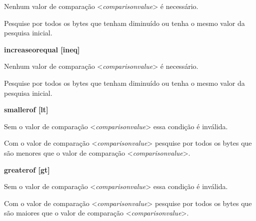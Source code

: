 \documentclass[letterpaper,10pt,brazil]{sphinxmanual}
\begin{document}
\begin{DUlineblock}{0em}
\begin{DUlineblock}{\DUlineblockindent}
\item[] 
\end{DUlineblock}
\item[] Nenhum valor de comparação \textless{}\emph{comparisonvalue}\textgreater{} é necessário.
\item[] 
\item[] Pesquise por todos os bytes que tenham diminuído ou tenha o mesmo valor da pesquisa inicial.
\item[] 
\item[]
\begin{DUlineblock}{\DUlineblockindent}
\item[] \textbf{increaseorequal {[}ineq{]}}
\item[] 
\end{DUlineblock}
\item[] Nenhum valor de comparação \textless{}\emph{comparisonvalue}\textgreater{} é necessário.
\item[] 
\item[] Pesquise por todos os bytes que tenham diminuído ou tenha o mesmo valor da pesquisa inicial.
\item[] 
\item[]
\begin{DUlineblock}{\DUlineblockindent}
\item[] \textbf{smallerof {[}lt{]}}
\item[] 
\end{DUlineblock}
\item[] Sem o valor de comparação \textless{}\emph{comparisonvalue}\textgreater{} essa condição é inválida.
\item[] Com o valor de comparação \textless{}\emph{comparisonvalue}\textgreater{} pesquise por todos os bytes que são menores que o valor de comparação \textless{}\emph{comparisonvalue}\textgreater{}.
\item[] 
\item[]
\begin{DUlineblock}{\DUlineblockindent}
\item[] \textbf{greaterof {[}gt{]}}
\item[] 
\end{DUlineblock}
\item[] Sem o valor de comparação \textless{}\emph{comparisonvalue}\textgreater{} essa condição é inválida.
\item[] Com o valor de comparação \textless{}\emph{comparisonvalue}\textgreater{} pesquise por todos os bytes que são maiores que o valor de comparação \textless{}\emph{comparisonvalue}\textgreater{}.

\end{DUlineblock}
\end{document}

